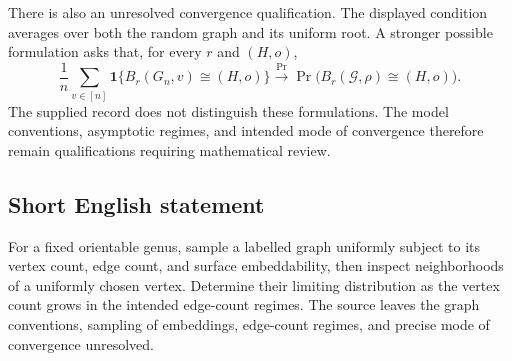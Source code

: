 \documentclass[11pt]{article}
\begin{document}
There is also an unresolved convergence qualification. The displayed condition averages over both the random graph and its uniform root. A stronger possible formulation asks that, for every \(r\) and \((H,o)\),
\[
\frac{1}{n}\sum_{v\in[n]}\mathbf 1\{B_r(G_n,v)\cong(H,o)\}
\xrightarrow{\Pr}
\Pr\bigl(B_r(\mathcal G,\rho)\cong(H,o)\bigr).
\]
The supplied record does not distinguish these formulations. The model conventions, asymptotic regimes, and intended mode of convergence therefore remain qualifications requiring mathematical review.
\subsection{Short English statement}
For a fixed orientable genus, sample a labelled graph uniformly subject to its vertex count, edge count, and surface embeddability, then inspect neighborhoods of a uniformly chosen vertex. Determine their limiting distribution as the vertex count grows in the intended edge-count regimes. The source leaves the graph conventions, sampling of embeddings, edge-count regimes, and precise mode of convergence unresolved.
\end{document}
